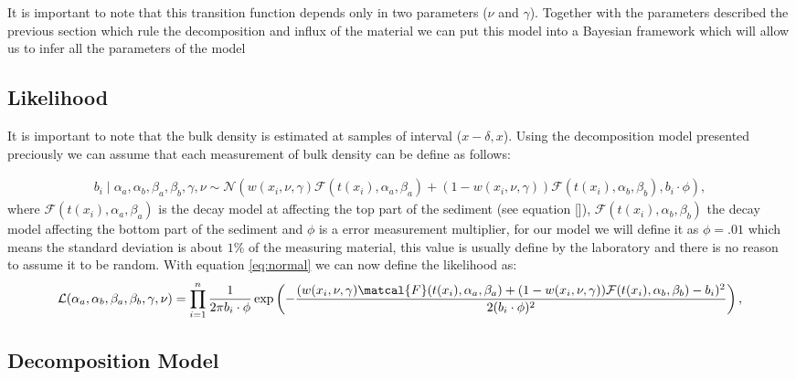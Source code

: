 \documentclass [10pt] {article}
\begin{document}
It is important to note that this transition function depends only in two parameters ($\nu$ and $\gamma$). Together with the parameters described the previous section which rule the decomposition and influx of the material we can put this model into a Bayesian framework which will allow us to infer all the parameters of the model

\subsection{Likelihood}

It is important to note that the bulk density is estimated at samples of interval ($x-\delta,x$). Using the decomposition model presented preciously we can assume that each measurement of bulk density can be define as follows:

\begin{eqnarray}
	b_i\mid \alpha_a,\alpha_b, \beta_a,\beta_b,\gamma, \nu \sim \mathcal{N}\left( w(x_i,\nu,\gamma) \mathcal{F}(t(x_i),\alpha_a,\beta_a) + (1-w(x_i,\nu,\gamma)) \mathcal{F}(t(x_i),\alpha_b,\beta_b)          ,b_i \cdot \phi  \right), \label{eq:normal}
\end{eqnarray} 
where $\mathcal{F}(t(x_i),\alpha_a,\beta_a) $ is the decay model at affecting the top part of the sediment (see equation []), $\mathcal{F}(t(x_i),\alpha_b,\beta_b)$ the decay model affecting the bottom part of the sediment and $\phi$ is a error measurement multiplier, for our model we will define it as $\phi=.01$ which means the standard deviation is about $1\%$ of the measuring material, this value is usually define by the laboratory and there is no reason to assume it to be random. With equation \ref{eq:normal} we can now define the likelihood as:
\begin{eqnarray}
	\mathcal{L}(\alpha_a,\alpha_b, \beta_a,\beta_b,\gamma, \nu) = \prod_{i=1}^n\frac{1}{2\pi b_i\cdot\phi} \exp\left(-\frac{( w(x_i,\nu,\gamma) \matcal{F}(t(x_i),\alpha_a,\beta_a) + (1-w(x_i,\nu,\gamma)) \mathcal{F}(t(x_i),\alpha_b,\beta_b) - b_i)^2 }{ 2( b_i \cdot \phi )^2 }  \right), \label{eq:normal}
\end{eqnarray} 


\subsection{Decomposition Model}
\end{document}
